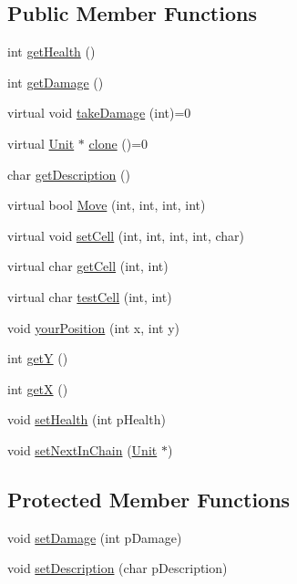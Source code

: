\subsection*{\-Public \-Member \-Functions}
\begin{DoxyCompactItemize}
\item 
int \hyperlink{class_unit_a610a98a68a3e99227b15af4161f26b70}{get\-Health} ()
\item 
int \hyperlink{class_unit_a7b0dbed96660669a2234b715018781fa}{get\-Damage} ()
\item 
virtual void \hyperlink{class_unit_acf436602434c7aa33e9ace724dd48cf0}{take\-Damage} (int)=0
\item 
virtual \hyperlink{class_unit}{\-Unit} $\ast$ \hyperlink{class_unit_add809c0669cb6b08afae913da60c4cc1}{clone} ()=0
\item 
char \hyperlink{class_unit_a2e8a1bb1c663b7a49f3086fa25e3aed1}{get\-Description} ()
\item 
virtual bool \hyperlink{class_unit_a3a1ea72471b9effea5a5a24473025586}{\-Move} (int, int, int, int)
\item 
virtual void \hyperlink{class_unit_a7448d5a8193afa3c6249fb96399adca5}{set\-Cell} (int, int, int, int, char)
\item 
virtual char \hyperlink{class_unit_a24ab85d43fd8252cb8ddc51072165ce9}{get\-Cell} (int, int)
\item 
virtual char \hyperlink{class_unit_a0dd2aec8c26166f1256cadb41f24e17c}{test\-Cell} (int, int)
\item 
void \hyperlink{class_unit_afe7865666c55b140c1fb657e0840b5b2}{your\-Position} (int x, int y)
\item 
int \hyperlink{class_unit_ab103f4e688f764e5f1a45ab37b30f6cc}{get\-Y} ()
\item 
int \hyperlink{class_unit_a1e612a48ea929b7628195e26a86ce037}{get\-X} ()
\item 
void \hyperlink{class_unit_a298f129e9a855396455734f3730783eb}{set\-Health} (int p\-Health)
\item 
void \hyperlink{class_unit_af789114387cfa1ad6470b5f998aa3dd5}{set\-Next\-In\-Chain} (\hyperlink{class_unit}{\-Unit} $\ast$)
\end{DoxyCompactItemize}
\subsection*{\-Protected \-Member \-Functions}
\begin{DoxyCompactItemize}
\item 
void \hyperlink{class_unit_a335b3beb829c26a1ca09acd0324286fd}{set\-Damage} (int p\-Damage)
\item 
void \hyperlink{class_unit_afdc5c1f9b46d7e5209a46d31da4a656c}{set\-Description} (char p\-Description)
\end{DoxyCompactItemize}
